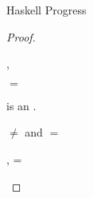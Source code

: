 \begin{theorem}{Haskell Progress}
\begin{proof}
\begin{case}{\psfield}
\end{case}


\newcommand{\pspnull}{\exppnull{\first{\varexph}}\xspace}
\renewcommand{\x}{\expnils{\vartyh}\xspace}
\renewcommand{\y}{\expcons{\second{\varexph}}{\third{\varexph}}}

\begin{case}{\pspnull}

\pshypby
{\first{\varexph}}
{\second{\varexph}}
\psvalifinh
{\first{\varexph}}
{\tylist{\vartyh}}
{\x, \y}
\psred
{\exppnull{(\x)}}
{}
\psred
{\exppnull{(\y)}}
{}
\pssub
{\first{\varexph}}
{\second{\varexph}}
{\pspnull}
{\exppnull{\second{\varexph}}}
\pserr
{\first{\varexph}}
{\pspnull}

\end{case}



\newcommand{\pswrongs}{\expwrongs{\vartyh}{\varstr}\xspace}

\begin{case}{\pswrongs}

\psred
{\pswrongs}
{\emph{\experr{\varstr}}}

\end{case}


\newcommand{\pshm}{\exphm{\first{\vartyh}}{\first{\vartym}}{\first{\varexpm}}}

\begin{case}{\pshm}

\pshypby
{\first{\varexpm}}
{\second{\varexpm}}
\pscasestwo
{\first{\varexpm}}
{\first{\vartyh}}
{\first{\vartym}}
{\pshm}


\begin{subcase}{\first{\vartyh} $=$ \tylump}

\exphm{\tylump}{\first{\vartym}}{\first{\varexpm}} is an \prouv.

\end{subcase}


\begin{subcase}{\first{\vartyh} $\neq$ \tylump and \first{\vartym} $=$ \tylump}

\psvalinh
{\first{\varexpm}}
{\tylump}
{\expmh{\tylump}{\second{\vartyh}}{\varexph}, \expms{\cslump}{\varvalfs}}
\psrednote
{\exphm{\first{\vartyh}}{\tylump}{(\expmh{\tylump}{\second{\vartyh}}{\varexph})}}
{\varexph}
{\first{\vartyh} = \second{\vartyh}}
\psrednote
{\exphm{\first{\vartyh}}{\tylump}{(\expmh{\tylump}{\second{\vartyh}}{\varexph})}}
{\varexph}
{\first{\vartyh} \neq \second{\vartyh}}
\psred
{\exphm{\first{\vartyh}}{\tylump}{(\expms{\cslump}{\varvalfs})}}
{\expwrongs{\first{\vartyh}}{\errvalue}}


\end{subcase}
\end{case}
\end{proof}
\end{theorem}
